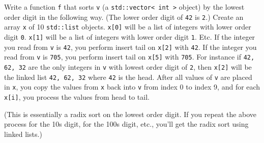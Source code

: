 

\nextq
Write a function \verb!f!
that sorts \verb!v! (a \verb!std::vector< int >! object)
by the lowest order digit in the following
way.
(The lower order digit of \verb!42! is \verb!2!.)
Create an array \verb!x! of 10 \verb!std::list! objects.
\verb!x[0]! will be a list of integers with lower order digit \verb!0!.
\verb!x[1]! will be a list of integers with lower order digit \verb!1!.
Etc.
If the integer you read from \verb!v! is \verb!42!, you perform
insert tail on \verb!x[2]! with \verb!42!.
If the integer you read from \verb!v! is \verb!705!, you perform
insert tail on \verb!x[5]! with \verb!705!.
For instance if \verb!42, 62, 32! are the only integers in \verb!v!
with lowest order digit of \verb!2!, then \verb!x[2]! will
be the linked list \verb!42, 62, 32! where \verb!42! is the head.
After all values of \verb!v! are placed in \verb!x!, you copy the values from
\verb!x! back into \verb!v! from index 0 to index 9,
and for each \verb!x[i]!, you process the values from head to tail.

(This is essentially a radix sort on the lowest order digit.
If you repeat the above process for the 10s digit, for the 100s digit, etc.,
you'll get the radix sort using linked lists.)

